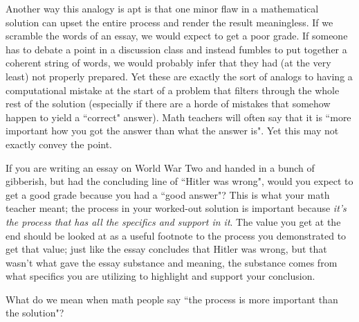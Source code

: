 \documentclass{ximera}
\begin{document}
Another way this analogy is apt is that one minor flaw in a mathematical solution can upset the entire process and render the result meaningless. If we scramble the words of an essay, we would expect to get a poor grade. If someone has to debate a point in a discussion class and instead fumbles to put together a coherent string of words, we would probably infer that they had (at the very least) not properly prepared. Yet these are exactly the sort of analogs to having a computational mistake at the start of a problem that filters through the whole rest of the solution (especially if there are a horde of mistakes that somehow happen to yield a ``correct" answer). Math teachers will often say that it is ``more important how you got the answer than what the answer is". Yet this may not exactly convey the point.

If you are writing an essay on World War Two and handed in a bunch of gibberish, but had the concluding line of ``Hitler was wrong", would you expect to get a good grade because you had a ``good answer"? This is what your math teacher meant; the process in your worked-out solution is important because \textit{it's the process that has all the specifics and support in it}. The value you get at the end should be looked at as a useful footnote to the process you demonstrated to get that value; just like the essay concludes that Hitler was wrong, but that wasn't what gave the essay substance and meaning, the substance comes from what specifics you are utilizing to highlight and support your conclusion.

\begin{problem}
    What do we mean when math people say ``the process is more important than the solution"?
    \begin{multipleChoice}
    \end{multipleChoice}
\end{problem}
\end{document}
